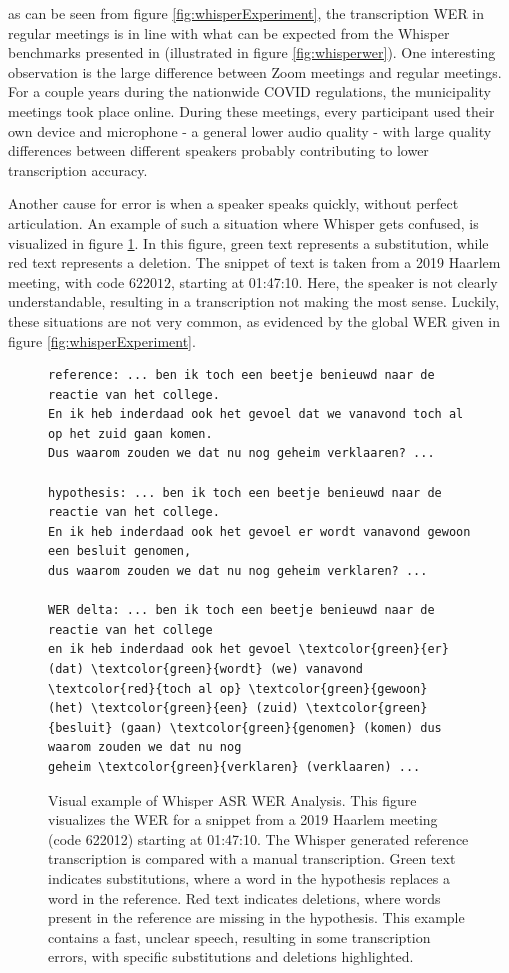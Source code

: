 \documentclass[twoside]{uva-inf-bachelor-thesis}
\begin{document}
as can be seen from figure \ref{fig:whisperExperiment}, the transcription WER in regular meetings is in line with what can be expected from the Whisper benchmarks presented in \cite{radford2023robust} (illustrated in figure \ref{fig:whisperwer}).
One interesting observation is the large difference between Zoom meetings and regular meetings. For a couple years during the nationwide COVID regulations, the municipality meetings took place online. During these meetings, every participant used their own device and microphone - a general lower audio quality - with large quality differences between different speakers probably contributing to lower transcription accuracy.

Another cause for error is when a speaker speaks quickly, without perfect articulation. 
An example of such a situation where Whisper gets confused, is visualized in figure \ref{fig:whisperResultWERVis1}. In this figure, green text represents a substitution, while red text represents a deletion. The snippet of text is taken from a 2019 Haarlem meeting, with code $622012$, starting at 01:47:10. Here, the speaker is not clearly understandable, resulting in a transcription not making the most sense. 
Luckily, these situations are not very common, as evidenced by the global WER given in figure \ref{fig:whisperExperiment}.

\begin{figure}[htbp]\caption{Visual example of Whisper ASR WER Analysis. This figure visualizes the WER for a snippet from a 2019 Haarlem meeting (code 622012) starting at 01:47:10. The Whisper generated reference transcription is compared with a manual transcription. Green text indicates substitutions, where a word in the hypothesis replaces a word in the reference. Red text indicates deletions, where words present in the reference are missing in the hypothesis. This example contains a fast, unclear speech, resulting in some transcription errors, with specific substitutions and deletions highlighted.}\label{fig:whisperResultWERVis1}
    \centering
\begin{Verbatim}[commandchars=\\\{\}]
reference: ... ben ik toch een beetje benieuwd naar de reactie van het college. 
En ik heb inderdaad ook het gevoel dat we vanavond toch al op het zuid gaan komen. 
Dus waarom zouden we dat nu nog geheim verklaaren? ...

hypothesis: ... ben ik toch een beetje benieuwd naar de reactie van het college. 
En ik heb inderdaad ook het gevoel er wordt vanavond gewoon een besluit genomen, 
dus waarom zouden we dat nu nog geheim verklaren? ...

WER delta: ... ben ik toch een beetje benieuwd naar de reactie van het college 
en ik heb inderdaad ook het gevoel \textcolor{green}{er} (dat) \textcolor{green}{wordt} (we) vanavond \textcolor{red}{toch al op} \textcolor{green}{gewoon} 
(het) \textcolor{green}{een} (zuid) \textcolor{green}{besluit} (gaan) \textcolor{green}{genomen} (komen) dus waarom zouden we dat nu nog 
geheim \textcolor{green}{verklaren} (verklaaren) ... 
\end{Verbatim}
\end{figure}
\end{document}
